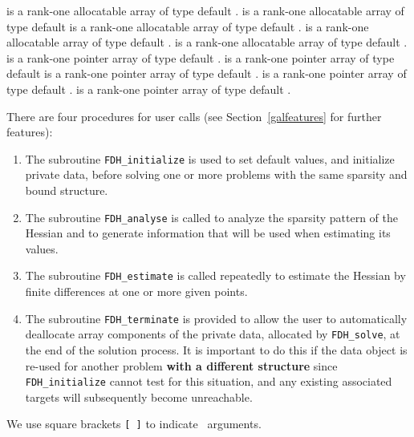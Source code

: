 \documentclass{galahad}
\newcommand{\packagename}{FDH}
\begin{document}
\begin{description}
 is a rank-one allocatable array of type default \integer.
 is a rank-one allocatable array of type default  \realdp
{} is a rank-one allocatable array of type default \complexdp.
 is a rank-one allocatable array of type default \character.
 is a rank-one allocatable array of type default \logical.
 is a rank-one pointer array of type default \integer.
 is a rank-one pointer array of type default  \realdp
{} is a rank-one pointer array of type default \complexdp.
 is a rank-one pointer array of type default \character.
 is a rank-one pointer array of type default \logical.
\end{description}


\galarguments
There are four procedures for user calls
(see Section~\ref{galfeatures} for further features): 

\begin{enumerate}
\item The subroutine 
      {\tt \packagename\_initialize} 
      is used to set default values, and initialize private data, 
      before solving one or more problems with the
      same sparsity and bound structure.
\item The subroutine 
      {\tt \packagename\_analyse} 
      is called to analyze the sparsity pattern of the Hessian
      and to generate information that will be used when estimating 
      its values.
\item The subroutine 
      {\tt \packagename\_estimate} 
      is called repeatedly to estimate the Hessian by finite differences at 
      one or more given points.
\item The subroutine 
      {\tt \packagename\_terminate} 
      is provided to allow the user to automatically deallocate array 
       components of the private data, allocated by 
       {\tt \packagename\_solve}, 
       at the end of the solution process. 
       It is important to do this if the data object is re-used for another 
       problem {\bf with a different structure}
       since {\tt \packagename\_initialize} cannot test for this situation, 
       and any existing associated targets will subsequently become unreachable.
\end{enumerate}
We use square brackets {\tt [ ]} to indicate \optional\ arguments.
\end{document}
